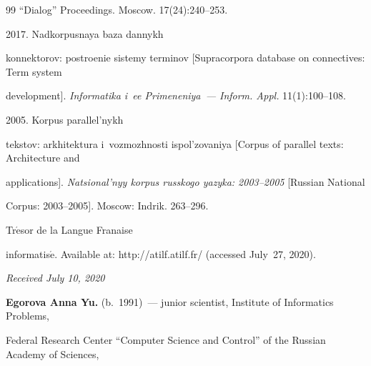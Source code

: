{{\begin{thebibliography}{99}
{``Dialog'' Proceedings}. Moscow. 17(24):240--253.




 2017. Nadkorpusnaya baza dannykh 


konnektorov: postroenie sistemy terminov [Supracorpora database on connectives: Term system 


development]. \textit{Informatika i~ee Primeneniya~--- Inform. Appl.} 11(1):100--108. 




 2005. Korpus parallel'nykh 


tekstov: arkhitektura i~vozmozhnosti ispol'zovaniya [Corpus of parallel texts: Architecture and 


applications]. \textit{Natsional'nyy korpus russkogo yazyka: 2003--2005} [Russian National 


Corpus: 2003--2005]. Moscow: Indrik. 263--296.




Tr$\acute{\mbox{e}}$sor de la Langue \mbox{Fran{}aise} 


informatis$\acute{\mbox{e}}$. Available at: {\sf http://atilf.atilf.fr/} (accessed July~27, 2020).


\end{thebibliography}


} }










\hfill{\small\textit{Received July 10, 2020}} 










\Contr








\noindent


\textbf{Egorova Anna Yu.} (b.\ 1991)~--- junior scientist, Institute of Informatics Problems, 


Federal Research Center ``Computer Science and Control'' of the Russian Academy of Sciences, 


